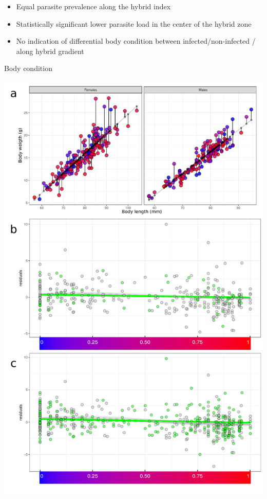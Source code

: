 \documentclass[24pt, a0paper, portrait, margin=5mm, innermargin=5mm,
               blockverticalspace=10mm, blocktitlewidthratio=0.5, colspace=10mm, 
               subcolspace=10mm]{tikzposter}
\begin{document}
{\begin{multicols*}{2}
\begin{multicols*}{2}
\end{multicols*}

\begin{itemize}
\item Equal parasite prevalence along the hybrid index
\item Statistically significant lower parasite load in the center of the hybrid zone
\item No indication of differential body condition between infected/non-infected / along hybrid gradient
\end{itemize}
\vfill\null \columnbreak
      

      
\Large \centering Body condition
      \begin{tikzfigure}[]
        \includegraphics[scale=0.7]{Figure4.pdf}
      \end{tikzfigure}


\end{multicols*}}
\end{document}
